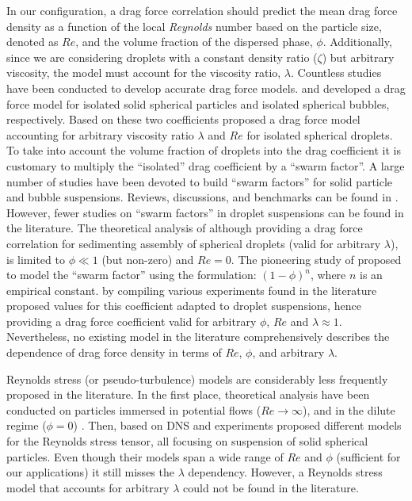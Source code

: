 In our configuration, a drag force correlation should predict the mean drag force density as a function of the local \textit{Reynolds} number based on the particle size, denoted as $Re$, and the volume fraction of the dispersed phase, $\phi$. 
Additionally, since we are considering droplets with a constant density ratio ($\zeta$) but arbitrary viscosity, the model must account for the viscosity ratio, $\lambda$. 
Countless studies have been conducted to develop accurate drag force models. 
\citet{schiller1933} and \citet{mei1994} developed a drag force model for isolated solid spherical particles and isolated spherical bubbles, respectively.
Based on these two coefficients \citet{magnaudet1997forces} proposed a drag force model accounting for arbitrary viscosity ratio $\lambda$ and $Re$ for isolated spherical droplets. 
To take into account the volume fraction of droplets into the drag coefficient it is customary to multiply the ``isolated'' drag coefficient by a ``swarm factor''. 
A large number of studies have been devoted to build ``swarm factors'' for solid particle and bubble suspensions. %
Reviews, discussions, and benchmarks can be found in \citet{simonin2016drag,tenneti2011drag,chen2023review}. 
However, fewer studies on ``swarm factors'' in droplet suspensions can be found in the literature. 
The theoretical analysis of \citet{wacholder1973,haber1981} although providing a drag force correlation for sedimenting assembly of spherical droplets (valid for arbitrary $\lambda$), is limited to $\phi \ll 1$ (but non-zero) and $Re =0$. 
The pioneering study of \citet{richardson1954} proposed to model the ``swarm factor'' using the formulation:  $(1-\phi)^n$, where $n$ is an empirical constant.  
\citet{ishii1979drag} by compiling various experiments found in the literature proposed values for this coefficient adapted to droplet suspensions, hence providing a drag force coefficient valid for arbitrary $\phi$, $Re$ and $\lambda\approx 1$.
Nevertheless, no existing model in the literature comprehensively describes the dependence of drag force density in terms of $Re$, $\phi$, and arbitrary $\lambda$. 

Reynolds stress (or pseudo-turbulence) models are considerably less frequently proposed in the literature. 
In the first place, theoretical analysis have been conducted on particles immersed in potential flows ($Re\to\infty$), and in the dilute regime ($\phi=0$) \citet{van1998pseudo}. 
Then, based on DNS and experiments \citet{mehrabadi2015pseudo,almeras2021statistics,xia2022improved} proposed different models for the Reynolds stress tensor, all focusing on suspension of solid spherical particles. 
Even though their models span a wide range of $Re$ and $\phi$ (sufficient for our applications) it still misses the $\lambda$ dependency. 
However, a Reynolds stress model that accounts for arbitrary $\lambda$ could not be found in the literature. 

